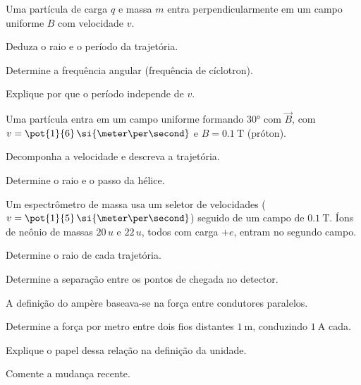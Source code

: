 \blocoaprofundamento
\begin{questao}[3]{}

Uma partícula de carga $q$ e massa $m$ entra perpendicularmente em um campo
uniforme $B$ com velocidade $v$.
\begin{itensq}
\item Deduza o raio e o período da trajetória.
\item Determine a frequência angular (frequência de cíclotron).
\item Explique por que o período independe de $v$.
\end{itensq}


\end{questao}
\begin{questao}[3]{}

Uma partícula entra em um campo uniforme formando $\ang{30}$ com $\vec B$, com
$v=\pot{1}{6}\,\si{\meter\per\second}$ e $B=\SI{0.1}{\tesla}$ (próton).
\begin{itensq}
\item Decomponha a velocidade e descreva a trajetória.
\item Determine o raio e o passo da hélice.
\end{itensq}


\end{questao}
\begin{questao}[3]{}

Um espectrômetro de massa usa um seletor de velocidades ($v=\pot{1}{5}\,
\si{\meter\per\second}$) seguido de um campo de $\SI{0.1}{\tesla}$. Íons de
neônio de massas $20\,u$ e $22\,u$, todos com carga $+e$, entram no segundo
campo.
\begin{itensq}
\item Determine o raio de cada trajetória.
\item Determine a separação entre os pontos de chegada no detector.
\end{itensq}


\end{questao}
\begin{questao}[3]{}

A definição do ampère baseava-se na força entre condutores paralelos.
\begin{itensq}
\item Determine a força por metro entre dois fios distantes
      $\SI{1}{\meter}$, conduzindo $\SI{1}{\ampere}$ cada.
\item Explique o papel dessa relação na definição da unidade.
\item Comente a mudança recente.
\end{itensq}


\end{questao}
